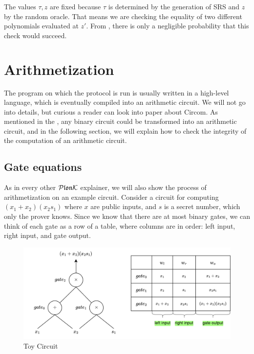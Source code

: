 The values $\tau, z$ are fixed because $\tau$ is determined by the generation of SRS and $z$ by the random oracle. That means we are checking the equality of two different polynomials evaluated at $z'$. From , there is only a negligible probability that this check would succeed.


\section{Arithmetization}
\label{chap:arithmetization}

The program on which the protocol is run is usually written in a high-level language, which is eventually compiled into an arithmetic circuit. We will not go into details, but curious a reader can look into paper \cite{circom} about Circom. As mentioned in the , any binary circuit could be transformed into an arithmetic circuit, and in the following section, we will explain how to check the integrity of the computation of an arithmetic circuit.

\subsection{Gate equations}
As in every other $\mathcal{P}\mathfrak{lon}\mathcal{K}$ explainer, we will also show the process of arithmetization on an example circuit. Consider a circuit for computing $(x_1 + x_2)(x_2s_1)$ where $x$ are public inputs, and $s$ is a secret number, which only the prover knows. Since we know that there are at most binary gates, we can think of each gate as a row of a table, where columns are in order: left input, right input, and gate output.

\begin{figure}[H]
    \centering
    \includegraphics[width=1\linewidth]{figures/arithmetization.drawio.png}
    \caption{Toy Circuit}
    \label{fig:toy-circuit}
\end{figure}


